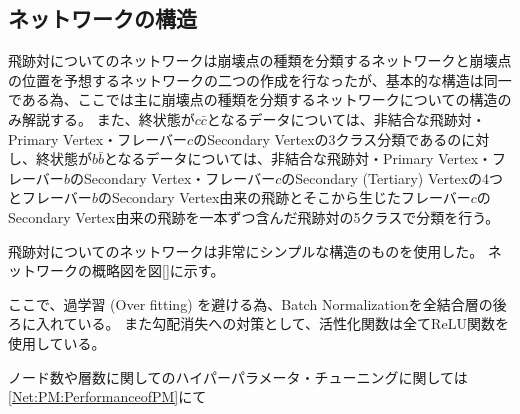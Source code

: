 \subsection{ネットワークの構造} \label{Net:PM:StructureofPM}

飛跡対についてのネットワークは崩壊点の種類を分類するネットワークと崩壊点の位置を予想するネットワークの二つの作成を行なったが、基本的な構造は同一である為、ここでは主に崩壊点の種類を分類するネットワークについての構造のみ解説する。
また、終状態が$c\bar{c}$となるデータについては、非結合な飛跡対・Primary Vertex・フレーバー$c$のSecondary Vertexの3クラス分類であるのに対し、終状態が$b\bar{b}$となるデータについては、非結合な飛跡対・Primary Vertex・フレーバー$b$のSecondary Vertex・フレーバー$c$のSecondary (Tertiary) Vertexの4つとフレーバー$b$のSecondary Vertex由来の飛跡とそこから生じたフレーバー$c$のSecondary Vertex由来の飛跡を一本ずつ含んだ飛跡対の5クラスで分類を行う。

飛跡対についてのネットワークは非常にシンプルな構造のものを使用した。
ネットワークの概略図を図\ref{}に示す。

ここで、過学習 (Over fitting) を避ける為、Batch Normalization\cite{}を全結合層の後ろに入れている。
また勾配消失への対策として、活性化関数は全てReLU関数を使用している。

ノード数や層数に関してのハイパーパラメータ・チューニングに関しては\ref{Net:PM:PerformanceofPM}にて

